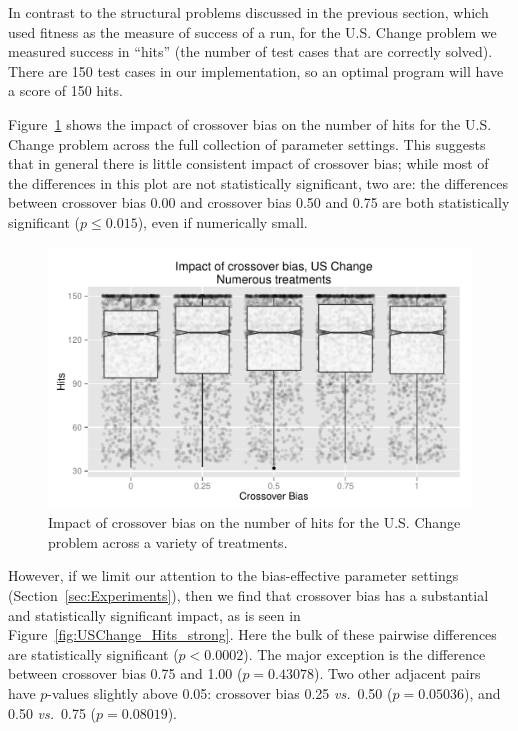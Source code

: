 \documentclass{sig-alternate}
\begin{document}
In contrast to the structural problems discussed in the previous section, which used fitness as the measure of success
of a run, for the U.S. Change problem we measured success in ``hits'' (the number of test cases that are correctly
solved). There are 150 test cases in our implementation, so an optimal program will have a score of 150 hits.

Figure~\ref{fig:USChange_Hits} shows the impact of crossover bias on the number of hits for the U.S. Change problem
across the full collection of parameter settings. This suggests that in general there is little consistent impact of
crossover bias; while most of the differences in this plot are not statistically significant, two are: the differences
between crossover bias 0.00 and crossover bias 0.50 and 0.75 are both statistically significant ($p \leq 0.015$), even
if numerically small.

\begin{figure}[tb]
\centering
\includegraphics[width=0.45 \textwidth]{Plots/US_change_hits.pdf}
\caption{Impact of crossover bias on the number of hits for the U.S. Change problem across a variety of treatments.}
\label{fig:USChange_Hits}
\end{figure}

%
%
%
%

However, if we limit our attention to the bias-effective parameter settings (Section~\ref{sec:Experiments}), then we
find that crossover bias has a substantial and statistically significant impact, as is seen in
Figure~\ref{fig:USChange_Hits_strong}. Here the bulk of these pairwise differences are statistically significant
($p<0.0002$). The major exception is the difference between crossover bias 0.75 and 1.00 ($p=0.43078$). Two other
adjacent pairs have $p$-values slightly above 0.05: crossover bias 0.25 \emph{vs.}\ 0.50 ($p=0.05036$), and 0.50
\emph{vs.}\ 0.75 ($p=0.08019$).
\end{document}
